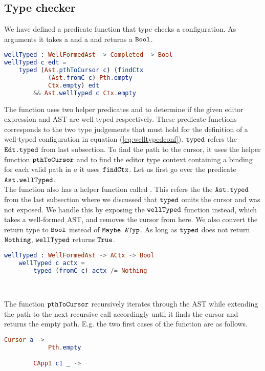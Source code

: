 \subsection{Type checker}

We have defined a predicate function  that type checks a
configuration. As arguments it takes a  and a  and returns a $\texttt{Bool}$.
\begin{lstlisting}[language=elm,%
                   gobble=0,%
                   ]
wellTyped : WellFormedAst -> Completed -> Bool
wellTyped c edt =
    typed (Ast.pthToCursor c) (findCtx
            (Ast.fromC c) Pth.empty
            Ctx.empty) edt
        && Ast.wellTyped c Ctx.empty
\end{lstlisting}

The function uses two helper predicates  and  to
determine if the given editor expression and AST are well-typed respectively.
These predicate functions corresponds to the two type judgements that must hold
for the definition of a well-typed configuration in equation
(\ref{eq:welltypedconf}). $\texttt{typed}$ refers the $\texttt{Edt.typed}$ from last
subsection. To find the path to the cursor, it uses the helper function
$\texttt{pthToCursor}$ and to find the editor type context containing a binding
for each valid path in $a$ it uses $\texttt{findCtx}$. Let us first go over the
predicate $\texttt{Ast.wellTyped}$.\\

The  function also has a helper function called .
This refers the the $\texttt{Ast.typed}$ from the last subsection where we
discussed that $\texttt{typed}$ omits the cursor and was not exposed. We handle
this by exposing the $\texttt{wellTyped}$ function instead, which takes a
well-formed AST, and removes the cursor from here. We also convert the return
type to $\texttt{Bool}$ instead of $\texttt{Maybe ATyp}$. As long as $\texttt{typed}$
does not return $\texttt{Nothing}$, $\texttt{wellTyped}$ returns $\texttt{True}$.
\begin{lstlisting}[language=elm,%
                   gobble=4,%
                   ]
    wellTyped : WellFormedAst -> ACtx -> Bool
    wellTyped c actx =
        typed (fromC c) actx /= Nothing
\end{lstlisting}
~

The function $\texttt{pthToCursor}$ recursively iterates through the AST while
extending the path to the next recursive call accordingly until it finds the
cursor and returns the empty path. E.g. the two first cases of the function are
as follows.
\begin{lstlisting}[language=elm,%
                   gobble=8,%
                   ]
        Cursor a ->
            Pth.empty

        CApp1 c1 _ ->
\end{lstlisting}
~

